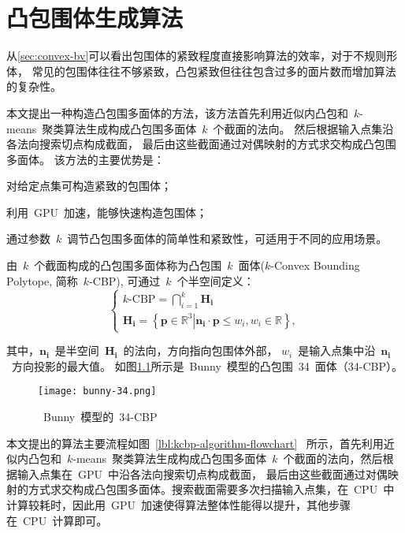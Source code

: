 

\chapter{凸包围体生成算法}
\label{cha:kcbp-construction}
从\ref{sec:convex-bv}可以看出包围体的紧致程度直接影响算法的效率，对于不规则形体， 常见的包围体往往不够紧致，凸包紧致但往往包含过多的面片数而增加算法的复杂性。

本文提出一种构造凸包围多面体的方法，该方法首先利用近似内凸包和~$k$-means~聚类算法生成构成凸包围多面体~$k$~个截面的法向。
然后根据输入点集沿各法向搜索切点构成截面， 最后由这些截面通过对偶映射的方式求交构成凸包围多面体。
该方法的主要优势是：
\begin{inparaenum}[(1)]
\item 对给定点集可构造紧致的包围体；
\item 利用~GPU~加速，能够快速构造包围体；
\item 通过参数~$k$~调节凸包围多面体的简单性和紧致性，可适用于不同的应用场景。
\end{inparaenum}

由~$k$~个截面构成的凸包围多面体称为凸包围~$k$~面体($k$-Convex Bounding Polytope, 简称~$k$-CBP), 可通过~$k$~个半空间定义：
\begin{equation}
\label{equ:kcbp_definition}
\left\{
\begin{array}{l}
    k\mbox{-CBP} = \mathop  \bigcap \limits_{i = 1}^k \bm{H_i} \\
    \bm{H_i} = \left\{ {\left. {\bm{p} \in {\mathbb{R}^3}} \right| \bm{n_i} \cdot \bm{p} \le {w_i}} , w_i \in \mathbb{R} \right\},
\end{array}
\right.
\end{equation}

其中，$\bm{n_i}$~是半空间~$\bm{H_i}$~的法向，方向指向包围体外部，
$w_i$~是输入点集中沿~$\bm{n_i}$~方向投影的最大值。
如图\ref{fig:bunny}所示是~Bunny~模型的凸包围~34~面体（34-CBP）。

\begin{figure}[htbp] 
\centering
  \texttt{[image: bunny-34.png]}
  \caption{~Bunny~模型的~34-CBP }
  \label{fig:bunny}
\end{figure}

本文提出的算法主要流程如图~\ref{lbl:kcbp-algorithm-flowchart}~
所示，首先利用近似内凸包和~$k$-means~聚类算法生成构成凸包围多面体~$k$~个截面的法向，然后根据输入点集在~GPU~中沿各法向搜索切点构成截面，
最后由这些截面通过对偶映射的方式求交构成凸包围多面体。搜索截面需要多次扫描输入点集，在~CPU~中计算较耗时，因此用~GPU~加速使得算法整体性能得以提升，其他步骤在~CPU~计算即可。

